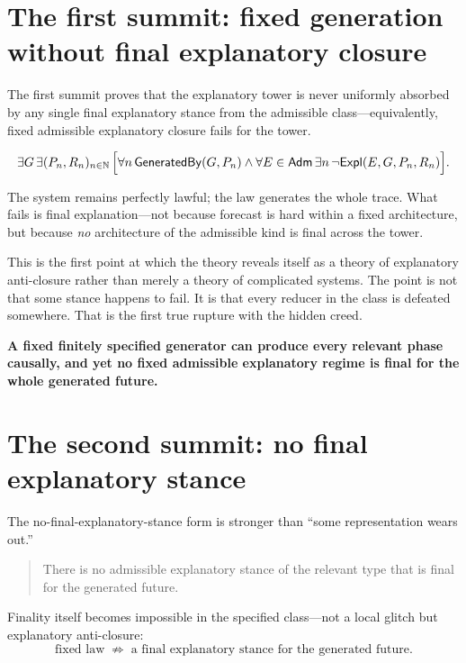 \documentclass[11pt,a4paper]{article}
\newenvironment{keybox}[1]{%
  \Needspace*{8\baselineskip}%
  \begin{tcolorbox}[
    enhanced, breakable=false,
    colback=blue!5, colframe=blue!45!black, coltitle=black,
    colbacktitle=blue!14, boxrule=0.85pt, arc=2.5pt,
    left=9pt, right=9pt, top=6pt, bottom=6pt,
    titlerule=0.55pt, fonttitle=\bfseries, title={#1},
    before upper=\raggedright,
    before skip=0.9\baselineskip, after skip=0.9\baselineskip
  ]%
}{%
  \end{tcolorbox}%
}
\theoremstyle{definition}
\newcommand{\Expl}{\mathsf{Expl}}
\newcommand{\GeneratedBy}{\mathsf{GeneratedBy}}
\newcommand{\Admissible}{\mathsf{Adm}}
\begin{document}
\section{The first summit: fixed generation without final explanatory closure}\label{sec:first-summit}

The first summit proves that the explanatory tower is never uniformly absorbed by any single final explanatory stance from the admissible class---equivalently, fixed admissible explanatory closure fails for the tower.

\[
\exists G\,\exists (P_n,R_n)_{n\in\mathbb{N}}\,
\Bigl[
\forall n\,\GeneratedBy(G,P_n)
\wedge
\forall E\in\Admissible\,\exists n\,\neg \Expl(E,G,P_n,R_n)
\Bigr].
\]

The system remains perfectly lawful; the law generates the whole trace. What fails is final explanation---not because forecast is hard within a fixed architecture, but because \emph{no} architecture of the admissible kind is final across the tower.

This is the first point at which the theory reveals itself as a theory of explanatory anti-closure rather than merely a theory of complicated systems. The point is not that some stance happens to fail. It is that every reducer in the class is defeated somewhere. That is the first true rupture with the hidden creed.

\begin{keybox}{The first summit}
\textbf{A fixed finitely specified generator can produce every relevant phase causally, and yet no fixed admissible explanatory regime is final for the whole generated future.}
\end{keybox}

\section{The second summit: no final explanatory stance}\label{sec:no-final-internal}

The no-final-explanatory-stance form is stronger than ``some representation wears out.''
\begin{quote}
There is no admissible explanatory stance of the relevant type that is final for the generated future.
\end{quote}

Finality itself becomes impossible in the specified class---not a local glitch but explanatory anti-closure:
\[
\text{fixed law} \;\not\Rightarrow\; \text{a final explanatory stance for the generated future}.
\]
\end{document}
